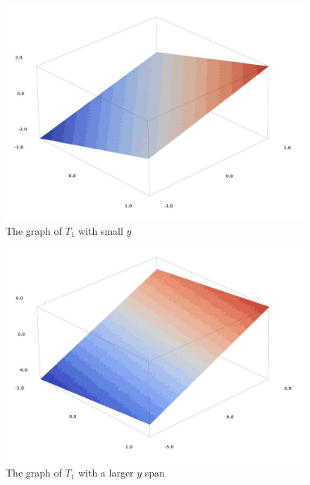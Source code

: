 \documentclass[a4paper,12pt]{article}
\begin{document}
\begin{figure}[H]
    \centering
    \includegraphics[scale=0.3]{3_t1_1.jpg}
    \caption{The graph of $T_{1}$ with small $y$}
    \label{3_t1_1}
\end{figure}
\begin{figure}[H]
    \centering
    \includegraphics[scale=0.3]{3_t1_2.jpg}
    \caption{The graph of $T_{1}$ with a larger $y$ span}
    \label{3_t1_2}
\end{figure}
\end{document}
